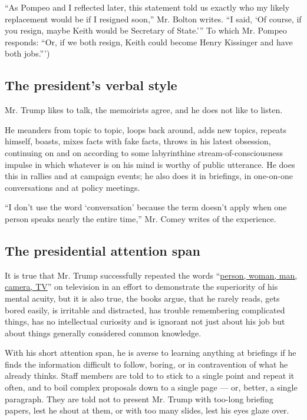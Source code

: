 ``As Pompeo and I reflected later, this statement told us exactly who my
likely replacement would be if I resigned soon,'' Mr. Bolton writes. ``I
said, `Of course, if you resign, maybe Keith would be Secretary of
State.''' To which Mr. Pompeo responds: ``Or, if we both resign, Keith
could become Henry Kissinger and have both jobs.''')

\hypertarget{the-presidents-verbal-style}{%
\subsection{The president's verbal
style}\label{the-presidents-verbal-style}}

Mr. Trump likes to talk, the memoirists agree, and he does not like to
listen.

He meanders from topic to topic, loops back around, adds new topics,
repeats himself, boasts, mixes facts with fake facts, throws in his
latest obsession, continuing on and on according to some labyrinthine
stream-of-consciousness impulse in which whatever is on his mind is
worthy of public utterance. He does this in rallies and at campaign
events; he also does it in briefings, in one-on-one conversations and at
policy meetings.

``I don't use the word `conversation' because the term doesn't apply
when one person speaks nearly the entire time,'' Mr. Comey writes of the
experience.

\hypertarget{the-presidential-attention-span}{%
\subsection{The presidential attention
span}\label{the-presidential-attention-span}}

It is true that Mr. Trump successfully repeated the words
``\href{https://www.nytimes.com/2020/07/23/us/politics/person-woman-man-camera-tv-trump.html}{person,
woman, man, camera, TV}'' on television in an effort to demonstrate the
superiority of his mental acuity, but it is also true, the books argue,
that he rarely reads, gets bored easily, is irritable and distracted,
has trouble remembering complicated things, has no intellectual
curiosity and is ignorant not just about his job but about things
generally considered common knowledge.

With his short attention span, he is averse to learning anything at
briefings if he finds the information difficult to follow, boring, or in
contravention of what he already thinks. Staff members are told to to
stick to a single point and repeat it often, and to boil complex
proposals down to a single page --- or, better, a single paragraph. They
are told not to present Mr. Trump with too-long briefing papers, lest he
shout at them, or with too many slides, lest his eyes glaze over.

